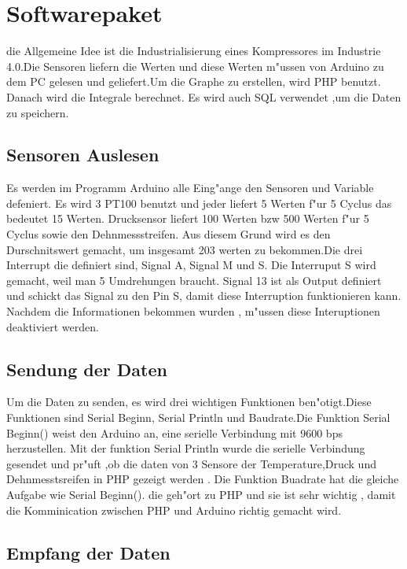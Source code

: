 \section{Softwarepaket}

die Allgemeine Idee ist die Industrialisierung eines Kompressores im 
Industrie 4.0.Die Sensoren liefern die Werten und diese Werten m"ussen 
von Arduino zu dem PC gelesen und geliefert.Um die Graphe zu erstellen,
wird PHP benutzt. Danach wird die Integrale berechnet.
Es wird auch SQL verwendet ,um die Daten zu speichern.

\subsection{Sensoren Auslesen}

Es werden im Programm Arduino alle Eing"ange den Sensoren und Variable defeniert.
Es wird 3 PT100 benutzt und jeder liefert 5 Werten f"ur 5 Cyclus das bedeutet 15 Werten. 
Drucksensor liefert 100 Werten bzw 500 Werten f"ur 5 Cyclus sowie den Dehnmessstreifen.
Aus diesem Grund wird es den Durschnitswert gemacht, um insgesamt 
203 werten zu bekommen.Die drei Interrupt die definiert sind, Signal A, Signal M und S.
Die Interruput S wird gemacht, weil man 5 Umdrehungen braucht. Signal 13 ist als Output definiert und schickt das Signal zu den Pin S,
damit diese Interruption funktionieren kann. Nachdem die Informationen bekommen wurden , m"ussen  diese Interuptionen deaktiviert werden.



\subsection{Sendung der Daten}

Um die Daten zu senden, es wird drei wichtigen Funktionen ben"otigt.Diese Funktionen sind Serial Beginn,
Serial Println und Baudrate.Die Funktion Serial Beginn() weist 
den Arduino an, eine serielle Verbindung mit 9600 bps herzustellen.
Mit der funktion Serial Println wurde die serielle Verbindung gesendet 
und pr"uft ,ob die daten von 3 Sensore der Temperature,Druck und Dehnmesstsreifen in PHP gezeigt werden .
Die Funktion Buadrate hat die gleiche Aufgabe wie Serial Beginn(). die geh"ort zu PHP 
und sie ist sehr wichtig , damit die Komminication zwischen PHP und Arduino richtig gemacht wird.
   
\subsection{Empfang der Daten}

